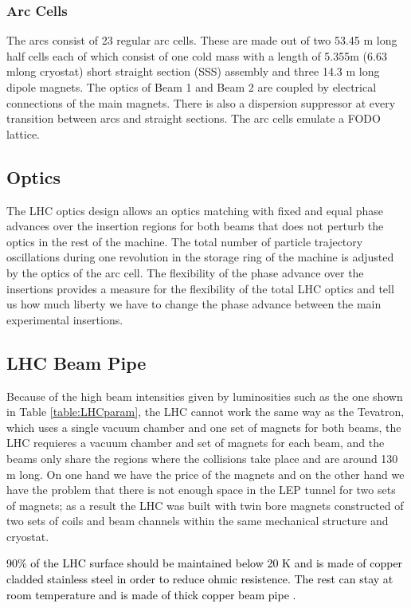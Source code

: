 \subsubsection{Arc Cells}
The arcs consist of 23 regular arc cells. These are made out of two 53.45 m long half cells each of which consist of one cold mass with a length of 5.355m (6.63 mlong cryostat) short straight section (SSS) assembly and three 14.3 m long dipole magnets. The optics of Beam 1 and Beam 2 are coupled by electrical connections of the main magnets. There is also a dispersion suppressor at every transition between arcs and straight sections. The arc cells emulate a FODO lattice\citep{DR}.
\subsection{Optics}
The LHC optics design allows an optics matching with fixed and equal phase advances over the insertion regions for both beams that does not perturb the optics in the rest of the machine. The total number of particle trajectory oscillations during one revolution in the storage ring of the machine is adjusted by the optics of the arc cell. The flexibility of the phase advance over the insertions provides a measure for the flexibility of the total LHC optics and tell us how much liberty we have to change the phase advance between the main experimental insertions\cite{DR}.

\subsection{LHC Beam Pipe}
Because of the high beam intensities given by luminosities such as the one shown in Table \ref{table:LHCparam}, the LHC cannot work the same way as the Tevatron, which uses a single vacuum chamber and one set of magnets for both beams, the LHC requieres a vacuum chamber and set of magnets for each beam, and the beams only share the regions where the collisions take place and are around 130 m long\citep{DR}.
On one hand we have the price of the magnets and on the other hand we have the problem that there is not enough space in the LEP tunnel for two sets of magnets; as a result the LHC was built with twin bore magnets constructed of two sets of coils and beam channels within the same mechanical structure and cryostat\citep{DR}.

\textcolor{black}{90\% of the LHC surface should be maintained below 20 K and is made of copper cladded stainless steel in order to reduce ohmic resistence. The rest can stay at room temperature and is made of thick copper beam pipe \citep{DR}.}


